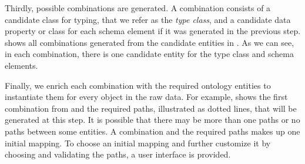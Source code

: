 Thirdly, possible combinations are generated. A combination consists of a candidate class for typing, that we refer as the \emph{type class}, and a candidate data property or class for each schema element if it was generated in the previous step.  shows all combinations generated from the candidate entities in . As we can see, in each combination, there is one candidate entity for the type class and schema elements.

\begin{table}[]
	\centering
	\caption{Combinations of generated entities for type class and schema elements}
	\label{tab:overviewCombinationsElements}
\end{table}

Finally, we enrich each combination with the required ontology entities to instantiate them for every object in the raw data. For example,  shows the first combination from  and the required paths, illustrated as dotted lines, that will be generated at this step. It is possible that there may be more than one paths or no paths between some entities. A combination and the required paths makes up one initial mapping. To choose an initial mapping and further customize it by choosing and validating the paths, a user interface is provided.

